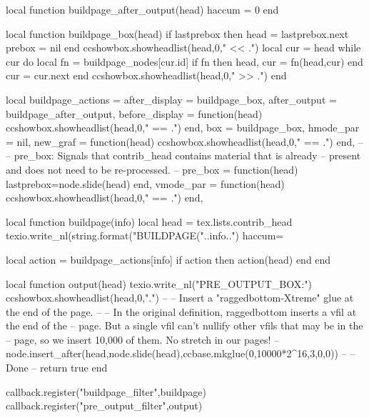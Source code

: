 local function buildpage_after_output(head)
  haccum = 0
end

local function buildpage_box(head)
  if lastprebox then
    head = lastprebox.next
    prebox = nil
  end
  ccshowbox.showheadlist(head,0,"  << .")
  local cur = head
  while cur do
    local fn = buildpage_nodes[cur.id]
    if fn then head, cur = fn(head,cur) end
    cur = cur.next
  end
  ccshowbox.showheadlist(head,0,"  >> .")
end

local buildpage_actions = {
  after_display  = buildpage_box,
  after_output   = buildpage_after_output,
  before_display = function(head) ccshowbox.showheadlist(head,0,"  == .") end,
  box            = buildpage_box,
  hmode_par      = nil,
  new_graf       = function(head) ccshowbox.showheadlist(head,0,"  == .") end,
  --
  -- pre_box: Signals that contrib_head contains material that is already
  -- present and does not need to be re-processed.
  --
  pre_box        = function(head) lastprebox=node.slide(head) end,
  vmode_par      = function(head) ccshowbox.showheadlist(head,0,"  == .") end,
}

local function buildpage(info)
  local head = tex.lists.contrib_head
  texio.write_nl(string.format("BUILDPAGE("..info..") haccum=%

  local action = buildpage_actions[info]
  if action then action(head) end
end

local function output(head)
  texio.write_nl("PRE_OUTPUT_BOX:")
  ccshowbox.showheadlist(head,0,".")
  --
  -- Insert a "raggedbottom-Xtreme" glue at the end of the page.
  --
  -- In the original definition, raggedbottom inserts a vfil at the end of the
  -- page. But a single vfil can't nullify other vfils that may be in the
  -- page, so we insert 10,000 of them. No stretch in our pages!
  --
  node.insert_after(head,node.slide(head),ccbase.mkglue(0,10000*2^16,3,0,0))
  --
  -- Done
  --
  return true
end

callback.register("buildpage_filter",buildpage)
callback.register("pre_output_filter",output)

